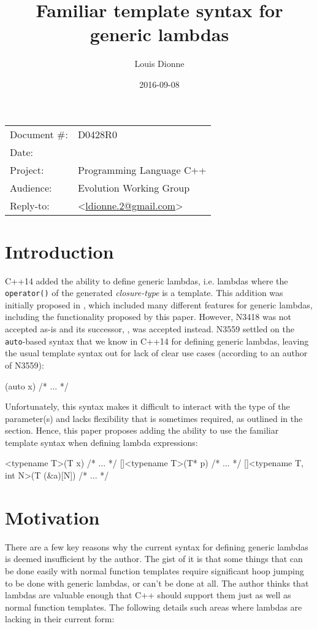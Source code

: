 \documentclass[11pt]{article}
\date{}
\title{Familiar template syntax for generic lambdas}
\author{}
\newcommand{\cc}[1]{\texttt{#1}}
\begin{document}
\maketitle\vspace{-2cm}

\begin{flushright}
  \begin{tabular}{ll}
  Document \#:&D0428R0\\
  Date:       &\date{2016-09-08}\\
  Project:    &Programming Language C++\\
  Audience:   &Evolution Working Group\\
  Reply-to:   &\author{Louis Dionne} \textless\href{mailto:ldionne.2@gmail.com}{ldionne.2@gmail.com}\textgreater
  \end{tabular}
\end{flushright}


\section{Introduction}
C++14 added the ability to define generic lambdas, i.e. lambdas where the
\cc{operator()} of the generated \textit{closure-type} is a template. This
addition was initially proposed in \cite{N3418}, which included many different
features for generic lambdas, including the functionality proposed by this
paper. However, N3418 was not accepted as-is and its successor,
\cite{N3559}, was accepted instead. N3559 settled on the \cc{auto}-based
syntax that we know in C++14 for defining generic lambdas, leaving the
usual template syntax out for lack of clear use cases (according to an author
of N3559):

\begin{cpp}
[](auto x) { /* ... */ }
\end{cpp}

Unfortunately, this syntax makes it difficult to interact with the type of the
parameter(s) and lacks flexibility that is sometimes required, as outlined in
the  section. Hence, this paper proposes adding the ability
to use the familiar template syntax when defining lambda expressions:

\begin{cpp}
[]<typename T>(T x) { /* ... */ }
[]<typename T>(T* p) { /* ... */ }
[]<typename T, int N>(T (&a)[N]) { /* ... */ }
\end{cpp}


\section{Motivation} \label{motivation}
There are a few key reasons why the current syntax for defining generic lambdas
is deemed insufficient by the author. The gist of it is that some things that
can be done easily with normal function templates require significant hoop
jumping to be done with generic lambdas, or can't be done at all. The author
thinks that lambdas are valuable enough that C++ should support them just as
well as normal function templates. The following details such areas where
lambdas are lacking in their current form:
\end{document}
